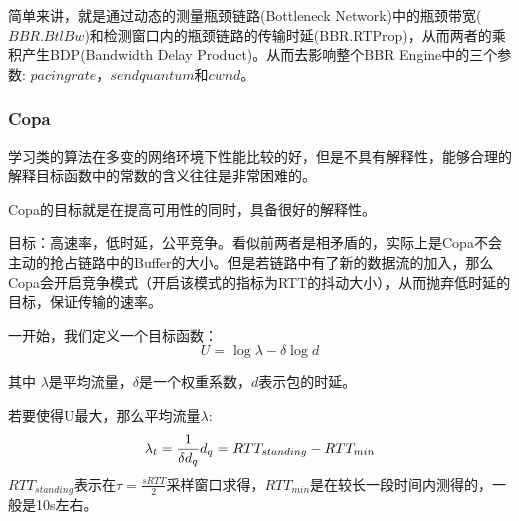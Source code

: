 \documentclass[a4paper, 12pt, UTF8]{ctexart}
\begin{document}
\par 简单来讲，就是通过动态的测量瓶颈链路(Bottleneck Network)中的瓶颈带宽($BBR.BtlBw$)和检测窗口内的瓶颈链路的传输时延(BBR.RTProp)，从而两者的乘积产生BDP(Bandwidth Delay Product)。从而去影响整个BBR Engine中的三个参数: $pacing rate$，$send quantum$和$cwnd$。



\subsubsection{Copa}

\par 学习类的算法在多变的网络环境下性能比较的好，但是不具有解释性\cite{DongMZAGGS18}，能够合理的解释目标函数中的常数的含义往往是非常困难的。


\par Copa\cite{DBLP:conf/nsdi/ArunB18}的目标就是在提高可用性的同时，具备很好的解释性。

\par 目标：高速率，低时延，公平竞争。看似前两者是相矛盾的，实际上是Copa不会主动的抢占链路中的Buffer的大小。但是若链路中有了新的数据流的加入，那么Copa会开启竞争模式（开启该模式的指标为RTT的抖动大小），从而抛弃低时延的目标，保证传输的速率。

\par 一开始，我们定义一个目标函数：
$$
U = \log\lambda-\delta \log d
$$
\par 其中 $\lambda$是平均流量，$\delta$是一个权重系数，$d$表示包的时延。

\par 若要使得U最大，那么平均流量$\lambda$:
$$
\lambda_t = \frac{1}{\delta d_q}
\\
d_q = RTT_{standing}-RTT_{min}
$$
$RTT_{standing}$表示在$ \tau = \frac{sRTT}{2}$采样窗口求得，$RTT_{min}$是在较长一段时间内测得的，一般是10s左右。
\end{document}
